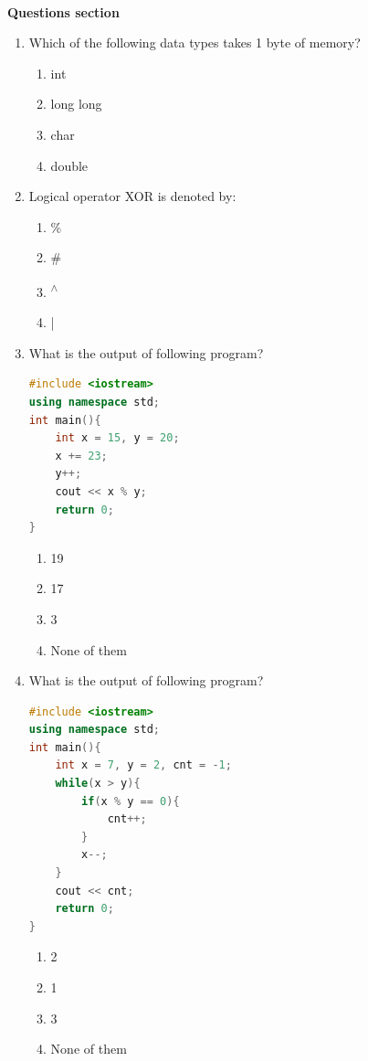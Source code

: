 \documentclass[10pt]{article}
\begin{document}
\textbf{
\\
{Questions section}\\
}
\begin{enumerate}


\item Which of the following data types takes 1 byte of memory?
\begin{multicols}{4}
\begin{enumerate}
    \item int
    \item long long
    \item char 
    \item double
\end{enumerate}
\end{multicols}
\item Logical operator XOR is denoted by:
\begin{multicols}{4}
\begin{enumerate}
    \item \%
    \item \#
    \item \textsuperscript{$\wedge$} 
    \item |
\end{enumerate}
\end{multicols}



\item What is the output of following program?
\begin{lstlisting}[language=C++]
#include <iostream>
using namespace std;
int main(){
    int x = 15, y = 20;
    x += 23;
    y++;
    cout << x % y;
    return 0;
}

\end{lstlisting}
\begin{multicols}{4}
\begin{enumerate}
    \item 19
    \item 17
    \item 3
    \item None of them
\end{enumerate}
\end{multicols}

\item What is the output of following program?
\begin{lstlisting}[language=C++]
#include <iostream>
using namespace std;
int main(){
    int x = 7, y = 2, cnt = -1;
    while(x > y){
        if(x % y == 0){
            cnt++;
        }
        x--;
    }
    cout << cnt;
    return 0;
}
\end{lstlisting}
\begin{multicols}{4}
\begin{enumerate}
    \item 2
    \item 1
    \item 3
    \item None of them
\end{enumerate}
\end{multicols}



\end{enumerate}
\end{document}
